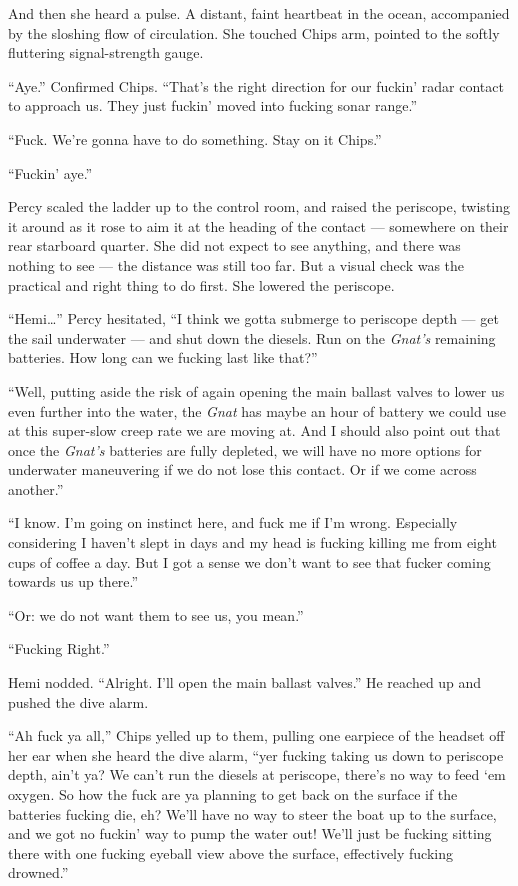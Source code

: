 \documentclass[
]{scrbook}
\begin{document}
And then she heard a pulse. A distant, faint heartbeat in the ocean,
accompanied by the sloshing flow of circulation. She touched Chips arm,
pointed to the softly fluttering signal-strength gauge.

``Aye.'' Confirmed Chips. ``That's the right direction for our fuckin'
radar contact to approach us. They just fuckin' moved into fucking sonar
range.''

``Fuck. We're gonna have to do something. Stay on it Chips.''

``Fuckin' aye.''

Percy scaled the ladder up to the control room, and raised the
periscope, twisting it around as it rose to aim it at the heading of the
contact --- somewhere on their rear starboard quarter. She did not
expect to see anything, and there was nothing to see --- the distance
was still too far. But a visual check was the practical and right thing
to do first. She lowered the periscope.

``Hemi\ldots{}'' Percy hesitated, ``I think we gotta submerge to
periscope depth --- get the sail underwater --- and shut down the
diesels. Run on the \emph{Gnat's} remaining batteries. How long can we
fucking last like that?''

``Well, putting aside the risk of again opening the main ballast valves
to lower us even further into the water, the \emph{Gnat} has maybe an
hour of battery we could use at this super-slow creep rate we are moving
at. And I should also point out that once the \emph{Gnat's} batteries
are fully depleted, we will have no more options for underwater
maneuvering if we do not lose this contact. Or if we come across
another.''

``I know. I'm going on instinct here, and fuck me if I'm wrong.
Especially considering I haven't slept in days and my head is fucking
killing me from eight cups of coffee a day. But I got a sense we don't
want to see that fucker coming towards us up there.''

``Or: we do not want them to see us, you mean.''

``Fucking Right.''

Hemi nodded. ``Alright. I'll open the main ballast valves.'' He reached
up and pushed the dive alarm.

``Ah fuck ya all,'' Chips yelled up to them, pulling one earpiece of the
headset off her ear when she heard the dive alarm, ``yer fucking taking
us down to periscope depth, ain't ya? We can't run the diesels at
periscope, there's no way to feed `em oxygen. So how the fuck are ya
planning to get back on the surface if the batteries fucking die, eh?
We'll have no way to steer the boat up to the surface, and we got no
fuckin' way to pump the water out! We'll just be fucking sitting there
with one fucking eyeball view above the surface, effectively fucking
drowned.''
\end{document}

